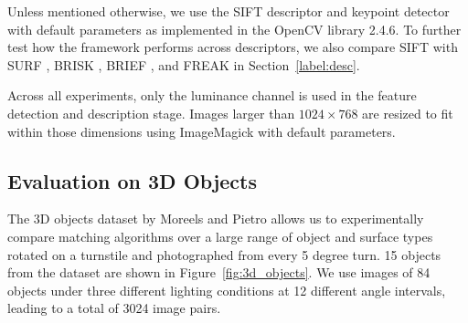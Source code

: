 \documentclass[review]{elsarticle}
\begin{document}
Unless mentioned otherwise, we use the SIFT descriptor and keypoint detector with default parameters as implemented in the OpenCV library 2.4.6.  To further test how the framework performs across descriptors, we also compare SIFT with SURF \cite{bay2006surf}, BRISK \cite{leutenegger2011brisk}, BRIEF \cite{calonder2010brief}, and FREAK \cite{alahi2012freak} in Section~\ref{label:desc}. 

Across all experiments, only the luminance channel is used in the feature detection and description stage.  Images larger than $1024\!\times\!768$ are resized to fit within those dimensions using ImageMagick with default parameters.  

\subsection{Evaluation on 3D Objects}
\label{S:3dobjects}

The 3D objects dataset by Moreels and Pietro \cite{moreels2007evaluation} allows us to experimentally compare matching algorithms over a large range of object and surface types rotated on a turnstile and photographed from every 5 degree turn.  15 objects from the dataset are shown in Figure~\ref{fig:3d_objects}.  We use images of 84 objects under three different lighting conditions at 12 different angle intervals, leading to a total of 3024 image pairs.  
\end{document}
